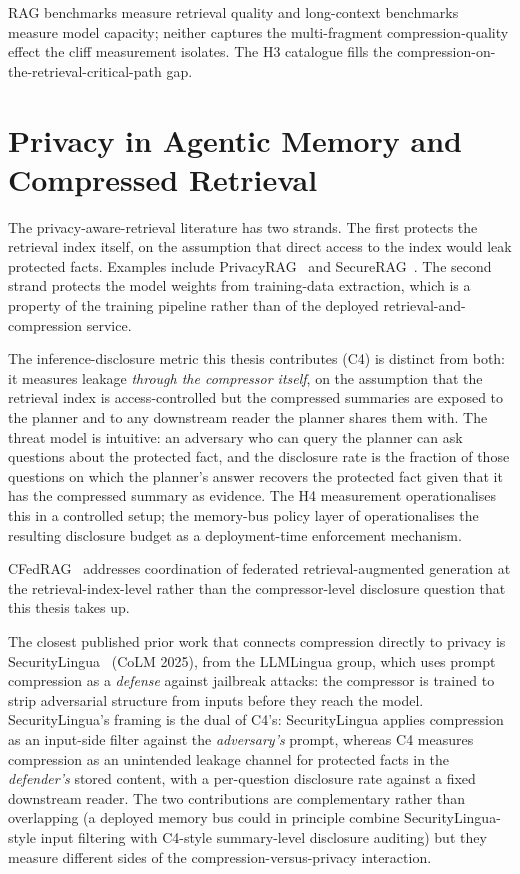 RAG benchmarks measure retrieval quality
and long-context benchmarks measure model capacity; neither captures
the multi-fragment compression-quality effect the cliff measurement
isolates. The H3 catalogue fills the
compression-on-the-retrieval-critical-path gap.

\section{Privacy in Agentic Memory and Compressed Retrieval}
\label{sec:rw_privacy}

The privacy-aware-retrieval literature has two strands.
The first protects the retrieval index itself, on the assumption
that direct access to the index would leak protected facts.
Examples include PrivacyRAG~\cite{zhou2025privacyrag} and
SecureRAG~\cite{bassit2025securerag}. The second strand protects
the model weights from training-data extraction, which is a
property of the training pipeline rather than of the deployed
retrieval-and-compression service.

The inference-disclosure metric this thesis contributes (C4) is
distinct from both: it measures leakage \emph{through the
compressor itself}, on the assumption that the retrieval index
is access-controlled but the compressed summaries are exposed to
the planner and to any downstream reader the planner shares them
with. The threat model is intuitive: an adversary who can query
the planner can ask questions about the protected fact, and the
disclosure rate is the fraction of those questions on which the
planner's answer recovers the protected fact given that it has
the compressed summary as evidence. The H4 measurement
operationalises this in a controlled setup; the memory-bus
policy layer of  operationalises
the resulting disclosure budget as a deployment-time enforcement
mechanism.

CFedRAG~\cite{addison2024cfedrag} addresses coordination of federated
retrieval-augmented generation at the retrieval-index-level rather than
the compressor-level disclosure question that this thesis takes up.

The closest published prior work that connects compression
directly to privacy is
SecurityLingua~\cite{li2025securitylingua} (CoLM 2025), from the
LLMLingua group, which uses prompt compression as a
\emph{defense} against jailbreak attacks: the compressor is
trained to strip adversarial structure from inputs before they
reach the model. SecurityLingua's framing is the dual of
C4's: SecurityLingua applies compression as an input-side
filter against the \emph{adversary's} prompt, whereas C4 measures
compression as an unintended leakage channel for protected facts
in the \emph{defender's} stored content, with a per-question
disclosure rate against a fixed downstream reader. The two
contributions are complementary rather than overlapping (a
deployed memory bus could in principle combine
SecurityLingua-style input filtering with C4-style summary-level
disclosure auditing) but they measure different sides of the
compression-versus-privacy interaction.

